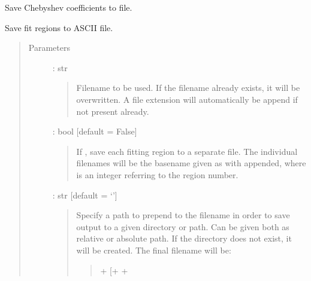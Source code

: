 \documentclass[letterpaper,10pt,english]{sphinxmanual}
\begin{document}

\begin{fulllineitems}
\label{\detokenize{api:output.save_cont_parameters_to_file}}
Save Chebyshev coefficients to file.

\end{fulllineitems}


\begin{fulllineitems}
\label{\detokenize{api:output.save_fit_regions}}
Save fit regions to ASCII file.
\begin{quote}\begin{description}
\item[{Parameters}] \leavevmode
{} : str
\begin{quote}

Filename to be used. If the filename already exists, it will be overwritten.
A  file extension will automatically be append if not present already.
\end{quote}

 : bool   {[}default = False{]}
\begin{quote}

If , save each fitting region to a separate file.
The individual filenames will be the basename given as 
with  appended, where  is an integer referring to the region number.
\end{quote}

 : str   {[}default = ‘’{]}
\begin{quote}

Specify a path to prepend to the filename in order to save output to a given
directory or path. Can be given both as relative or absolute path.
If the directory does not exist, it will be created.
The final filename will be:
\begin{quote}

 +  {[}+ \sphinxtitleref{\_regN}{]} + 
\end{quote}
\end{quote}

\end{description}\end{quote}

\end{fulllineitems}
\end{document}
